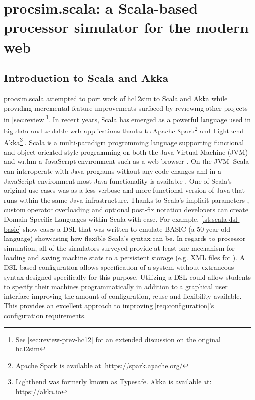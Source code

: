 \chapter{procsim.scala: a Scala-based processor simulator for the modern web}
\label{ch:scala-akka}

\newcommand{\scalainline}[1]{\texttt{#1}}
\newcommand{\akkaActor}{\scalainline{Actor}}

\section{Introduction to Scala and Akka}

procsim.scala attempted to port work of hc12sim to Scala and Akka while providing incremental feature improvements surfaced by reviewing other projects in \cref{sec:review}\footnote{See \cref{sec:review-prev-hc12} for an extended discussion on the original hc12sim}. In recent years, Scala has emerged as a powerful language used in big data and scalable web applications thanks to Apache Spark\footnote{Apache Spark is available at: \url{https://spark.apache.org/}} and Lightbend Akka\footnote{Lightbend was formerly known as Typesafe. Akka is available at: \url{https://akka.io}} \cite{Karau2015, Alexandrov2014, Singh2015}. Scala is a multi-paradigm programming language supporting functional and object-oriented style programming on both the Java Virtual Machine (JVM) and within a JavaScript environment such as a web browser \cite{Scala-Lang}. On the JVM, Scala can interoperate with Java programs without any code changes and in a JavaScript environment most Java functionality is available \cite{Scala-js2015,Doeraene2017}. One of Scala's original use-cases was as a less verbose and more functional version of Java that runs within the same Java infrastructure. Thanks to Scala's implicit parameters \cite{Scala-ImplicitParameters}, custom operator overloading \cite{Scala-Operators} and optional post-fix notation \cite{Scala-MethodInvocations} developers can create Domain-Specific Languages within Scala with ease. For example, \cref{lst:scala-dsl-basic} show cases a DSL that was written to emulate BASIC (a 50 year-old language) showcasing how flexible Scala's syntax can be. In regards to processor simulation, all of the simulators surveyed provide at least one mechanism for loading and saving machine state to a persistent storage (e.g. XML files for \cite{Skrien2001, Black2013}). A DSL-based configuration allows specification of a system without extraneous syntax designed specifically for this purpose. Utilizing a DSL could allow students to specify their machines programmatically in addition to a graphical user interface improving the amount of configuration, reuse and flexibility available. This provides an excellent approach to improving \cref{req:configuration}'s configuration requirements.

